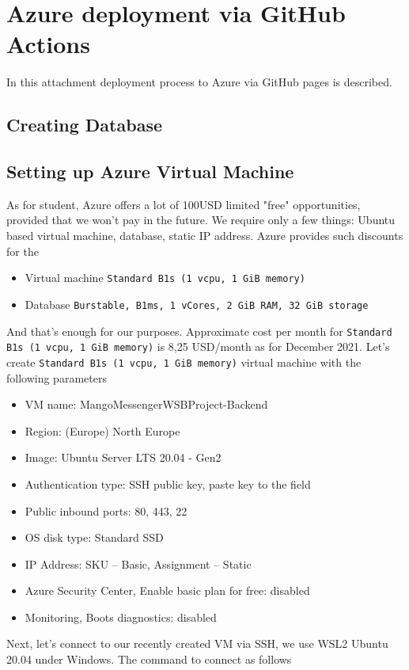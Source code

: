 \chapter{Azure deployment via GitHub Actions}\label{ch:azure-deloyment-via-github-actions}
In this attachment deployment process to Azure via GitHub pages is described.


\section{Creating Database}\label{sec:creating-database}


\section{Setting up Azure Virtual Machine}\label{sec:setting-up-azure-environment}
As for student, Azure offers a lot of 100USD limited "free" opportunities,
provided that we won't pay in the future.
We require only a few things: Ubuntu based virtual machine, database, static IP address.
Azure provides such discounts for the
\begin{itemize}
    \item Virtual machine \texttt{Standard B1s (1 vcpu, 1 GiB memory)}
    \item Database \texttt{Burstable, B1ms, 1 vCores, 2 GiB RAM, 32 GiB storage}
\end{itemize}
And that's enough for our purposes.
Approximate cost per month for \texttt{Standard B1s (1 vcpu, 1 GiB memory)} is 8,25 USD/month as for December 2021.
Let's create \texttt{Standard B1s (1 vcpu, 1 GiB memory)} virtual machine with the following parameters
\begin{itemize}
    \item VM name: MangoMessengerWSBProject-Backend
    \item Region: (Europe) North Europe
    \item Image: Ubuntu Server LTS 20.04 - Gen2
    \item Authentication type: SSH public key, paste key to the field
    \item Public inbound ports: 80, 443, 22
    \item OS disk type: Standard SSD
    \item IP Address: SKU -- Basic, Assignment -- Static
    \item Azure Security Center, Enable basic plan for free: disabled
    \item Monitoring, Boots diagnostics: disabled
\end{itemize}
Next, let's connect to our recently created VM via SSH, we use WSL2 Ubuntu 20.04 under Windows.
The command to connect as follows

